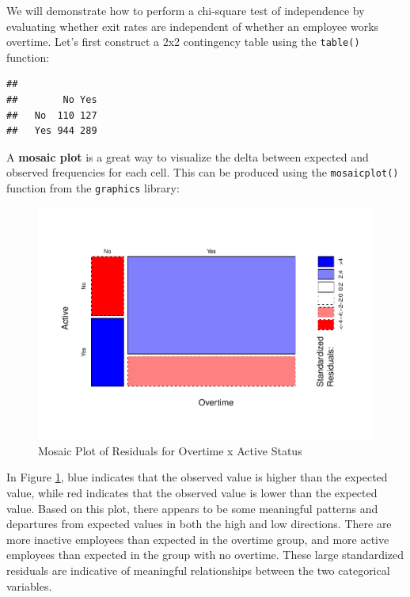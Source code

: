 \documentclass[
]{book}
\newenvironment{Shaded}{\begin{snugshade}}{\end{snugshade}}
\newcommand{\CommentTok}[1]{\textcolor[rgb]{0.56,0.35,0.01}{\textit{#1}}}
\newcommand{\FunctionTok}[1]{\textcolor[rgb]{0.00,0.00,0.00}{#1}}
\newcommand{\NormalTok}[1]{#1}
\newcommand{\OtherTok}[1]{\textcolor[rgb]{0.56,0.35,0.01}{#1}}
\newcommand{\SpecialCharTok}[1]{\textcolor[rgb]{0.00,0.00,0.00}{#1}}
\begin{document}
We will demonstrate how to perform a chi-square test of independence by evaluating whether exit rates are independent of whether an employee works overtime. Let's first construct a 2x2 contingency table using the \texttt{table()} function:

\begin{Shaded}
\end{Shaded}

\begin{verbatim}
##      
##        No Yes
##   No  110 127
##   Yes 944 289
\end{verbatim}

A \textbf{mosaic plot} is a great way to visualize the delta between expected and observed frequencies for each cell. This can be produced using the \texttt{mosaicplot()} function from the \texttt{graphics} library:

\begin{figure}

{\centering \includegraphics[width=1\linewidth]{People_Analytics_Lifecycle_files/figure-latex/mosaic-plot-1} 

}

\caption{Mosaic Plot of Residuals for Overtime x Active Status}\label{fig:mosaic-plot}
\end{figure}

In Figure \ref{fig:mosaic-plot}, blue indicates that the observed value is higher than the expected value, while red indicates that the observed value is lower than the expected value. Based on this plot, there appears to be some meaningful patterns and departures from expected values in both the high and low directions. There are more inactive employees than expected in the overtime group, and more active employees than expected in the group with no overtime. These large standardized residuals are indicative of meaningful relationships between the two categorical variables.
\end{document}
